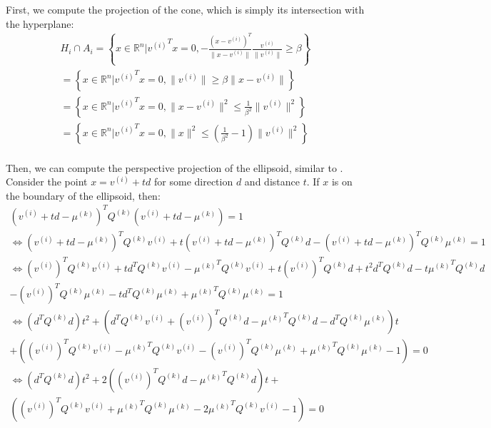\documentclass{article}
\theoremstyle{case}
\newcommand{\Rn}{\mathbb R^n}
\newcommand{\qk}{{Q^{(k)}}}
\newcommand{\centerk}{{\mu^{(k)}}}
\begin{document}
First, we compute the projection of the cone, which is simply its intersection with the hyperplane:
\begin{align*}
H_i \cap A_i 
= \left\{x \in \Rn \bigg| {v^{(i)}}^Tx = 0, -\frac{\left(x - v^{(i)}\right)^T}{\|x - v^{(i)}\|}\frac{v^{(i)}}{\|v^{(i)}\|}\ge \beta \right\} \\
= \left\{x \in \Rn \bigg| {v^{(i)}}^Tx = 0, \|v^{(i)}\|\ge \beta\|x - v^{(i)}\| \right\} \\
= \left\{x \in \Rn \bigg| {v^{(i)}}^Tx = 0, \|x - v^{(i)}\|^2 \le \frac 1 {\beta^2}\|v^{(i)}\|^2 \right\} \\
= \left\{x \in \Rn \bigg| {v^{(i)}}^Tx = 0, \|x\|^2 \le \left(\frac 1 {\beta^2} - 1\right)\|v^{(i)}\|^2 \right\} \\
\end{align*}

Then, we can compute the perspective projection of the ellipsoid, similar to \cite{eberly_2013}.
Consider the point $x = v^{(i)} + td$ for some direction $d$ and distance $t$.
If $x$ is on the boundary of the ellipsoid, then:
\begin{align*}
(v^{(i)} + t d - \centerk )^T \qk  (v^{(i)} + t d - \centerk ) = 1 \\
\Longleftrightarrow (v^{(i)} + t d - \centerk )^T \qk  v^{(i)} + t (v^{(i)} + t d - \centerk )^T \qk  d - (v^{(i)} + t d - \centerk )^T \qk  \centerk  = 1 \\
\Longleftrightarrow \left(v^{(i)}\right)^T \qk  v^{(i)} + t d^T \qk  v^{(i)} - \centerk ^T \qk  v^{(i)} + t \left(v^{(i)}\right)^T \qk  d + t^2 d^T \qk  d - t \centerk ^T \qk  d \\- \left(v^{(i)}\right)^T \qk  \centerk  - t d^T \qk  \centerk + \centerk ^T \qk  \centerk  = 1 \\
\Longleftrightarrow \left(d^T\qk d
\right) t^2 + \left(
d^T \qk  v^{(i)} +  \left(v^{(i)}\right)^T \qk  d - \centerk ^T \qk  d - d^T \qk  \centerk 
\right) t \\ +  \left(
\left(v^{(i)}\right)^T \qk  v^{(i)} - \centerk ^T \qk  v^{(i)} - \left(v^{(i)}\right)^T \qk  \centerk   + \centerk ^T \qk  \centerk  - 1
\right) = 0 \\
\Longleftrightarrow \left(d^T\qk d
\right) t^2 + 2\left(
\left(v^{(i)}\right)^T \qk  d - \centerk ^T\qk d
\right) t + \\ \left(
\left(v^{(i)}\right)^T \qk  v^{(i)} + \centerk ^T \qk  \centerk  - 2 \centerk ^T \qk  v^{(i)} - 1
\right) = 0
\end{align*}
\end{document}
